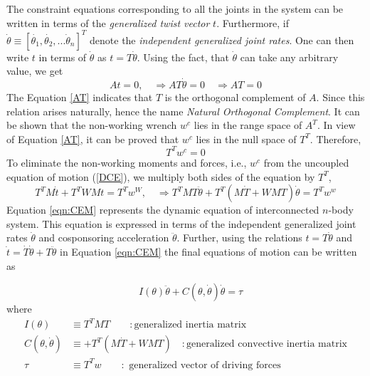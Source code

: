 The constraint equations corresponding to all the joints in the system can be written in terms of the \textit{generalized twist vector} $t$. Furthermore, if $ \dot{\theta} \equiv[\dot{\theta_1},\dot{\theta_2},...\dot\theta_n]^T$ denote the \textit{independent generalized joint rates}. One can then write $t$ in terms of $\dot{\theta}$ as $t=T\dot{\theta}$. 
Using the fact, that $\dot{\theta}$ can take any arbitrary value, we get
\begin{equation}
\label{AT}
At=0 , \quad \Rightarrow  AT\dot{\theta}=0\quad \Rightarrow AT=0
\end{equation}
The Equation \ref{AT} indicates that $T$ is the orthogonal complement of $A$.
 Since this relation arises naturally, hence the name \textit{Natural Orthogonal Complement}.  It can be shown \cite{angeles2013fundamentals} that the non-working wrench $w^c$ lies in the range space of $A^T$.   In view of Equation \ref{AT}, it can be proved that $w^c$ lies in the null space of $T^T$. Therefore,
\begin{equation}
T^Tw^c=0
\end{equation}
To eliminate the non-working  moments and  forces, i.e., $w^c$ from the uncoupled equation of motion (\ref{DCE}), we multiply both sides of the equation  by $T^T$,
\begin{equation}
 T^TM\dot{t}+T^TWMt=T^Tw^W, \quad
 \Rightarrow T^TMT\ddot{\theta}+T^T(M\dot{T}+WMT)\dot{\theta}=T^Tw^w
 \label{eqn:CEM}
\end{equation}
Equation \ref{eqn:CEM} represents the dynamic equation of  interconnected $n$-body system.
 This equation is expressed in terms of the independent generalized joint rates $\dot{\theta}$ and cosponsoring  acceleration $\ddot{\theta}$. Further, using the relations $t=T\dot{\theta}$ and $\dot{t}=\dot{T}\dot{\theta}+T\ddot{\theta}$  in Equation \ref{eqn:CEM}  the final equations of motion can be written as

\begin{equation}
\label{CE}
 \quad I(\theta)\ddot{\theta}+C(\theta,\dot{\theta})\dot{\theta}=\tau
\end{equation}
where
\begin{align*}
I(\theta) &\equiv T^TMT\quad \quad:\text{generalized inertia matrix}\\
C(\theta,\dot{\theta})&\equiv +T^T(M\dot{T}+WMT) \quad :\text{generalized  convective inertia matrix}\\
\tau&\equiv T^Tw \quad \quad :\text{ generalized vector of driving forces }
\end{align*}

